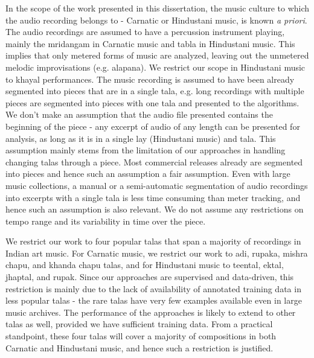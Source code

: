In the scope of the work presented in this dissertation, the music culture to which the audio recording belongs to - Carnatic or Hindustani music, is known \textit{a priori}. The audio recordings are assumed to have a percussion instrument playing, mainly the mridangam in Carnatic music and \gls{tabla} in Hindustani music. This implies that only metered forms of music are analyzed, leaving out the unmetered melodic improvisations (e.g. \gls{alapana}). We restrict our scope in Hindustani music to \gls{khayal} performances. The music recording is assumed to have been already segmented into pieces that are in a single \gls{tala}, e.g. long recordings with multiple pieces are segmented into pieces with one \gls{tala} and presented to the algorithms. We don't make an assumption that the audio file presented contains the beginning of the piece - any excerpt of audio of any length can be presented for analysis, as long as it is in a single \gls{lay} (Hindustani music) and \gls{tala}. This assumption mainly stems from the limitation of our approaches in handling changing \glspl{tala} through a piece. Most commercial releases already are segmented into pieces and hence such an assumption a fair assumption. Even with large music collections, a manual or a semi-automatic segmentation of audio recordings into excerpts with a single \gls{tala} is less time consuming than meter tracking, and hence such an assumption is also relevant. We do not assume any restrictions on tempo range and its variability in time over the piece. %

We restrict our work to four popular \glspl{tala} that span a majority of recordings in Indian art music. For Carnatic music, we restrict our work to \gls{adi}, \gls{rupaka}, \gls{mishra chapu}, and \gls{khanda chapu} \glspl{tala}, and for Hindustani music to \gls{teental}, \gls{ektal}, \gls{jhaptal}, and \gls{rupak}. Since our approaches are supervised and data-driven, this restriction is mainly due to the lack of availability of annotated training data in less popular \glspl{tala} - the rare \glspl{tala} have very few examples available even in large music archives. The performance of the approaches is likely to extend to other \glspl{tala} as well, provided we have sufficient training data. From a practical standpoint, these four \glspl{tala} will cover a majority of compositions in both Carnatic and Hindustani music, and hence such a restriction is justified. 

